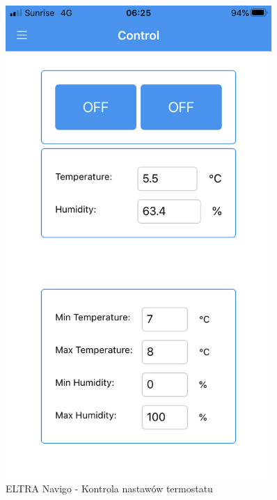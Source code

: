 \documentclass[a4paper,10pt]{article}
\begin{document}
\begin{figure}[H]
    \centering
    \begin{minipage}{0.45\textwidth}
        \centering
        \includegraphics[width=0.9\textwidth]{navigo_control.png} 
        \caption{ELTRA Navigo - Kontrola nastawów termostatu}
        \label{rysunek_navigo_control}
    \end{minipage}\hfill
    \begin{minipage}{0.45\textwidth}
        \centering

\end{minipage}
\end{figure}
\end{document}

